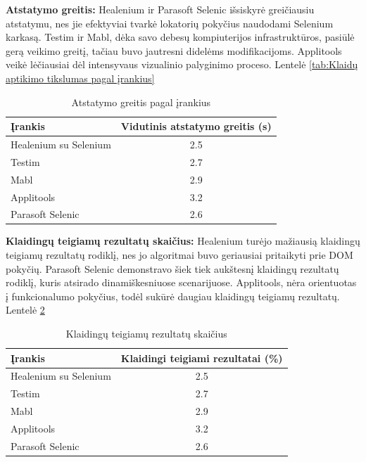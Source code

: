 \documentclass[
]{VUMIFPSkursinis}
\begin{document}
\textbf{Atstatymo greitis:} Healenium ir Parasoft Selenic išsiskyrė greičiausiu atstatymu, nes jie efektyviai tvarkė lokatorių pokyčius naudodami Selenium karkasą. Testim ir Mabl, dėka savo debesų kompiuterijos infrastruktūros, pasiūlė gerą veikimo greitį, tačiau buvo jautresni didelėms modifikacijoms. Applitools veikė lėčiausiai dėl intensyvaus vizualinio palyginimo proceso. Lentelė \ref{tab:Klaidų aptikimo tikslumas pagal įrankius}

\begin{table}[H]\footnotesize
  \centering
  \caption{Atstatymo greitis pagal įrankius}
  {\begin{tabular}{|l|c|} \hline
    Įrankis & Vidutinis atstatymo greitis (s) \\
    \hline
    Healenium su Selenium & 2.5             \\
    Testim                & 2.7            \\
    Mabl                  & 2.9            \\
    Applitools            & 3.2             \\
    Parasoft Selenic      & 2.6             \\
    \hline
  \end{tabular}}
  \label{tab:Atstatymo greitis}
\end{table}

\textbf{Klaidingų teigiamų rezultatų skaičius:} Healenium turėjo mažiausią klaidingų teigiamų rezultatų rodiklį, nes jo algoritmai buvo geriausiai pritaikyti prie DOM pokyčių. Parasoft Selenic demonstravo šiek tiek aukštesnį klaidingų rezultatų rodiklį, kuris atsirado dinamiškesniuose scenarijuose. Applitools, nėra orientuotas į funkcionalumo pokyčius, todėl sukūrė daugiau klaidingų teigiamų rezultatų.
Lentelė \ref{tab:Klaidingų teigiamų rezultatų skaičius}

\begin{table}[H]\footnotesize
  \centering
  \caption{Klaidingų teigiamų rezultatų skaičius}
  {\begin{tabular}{|l|c|} \hline
    Įrankis & Klaidingi teigiami rezultatai (\%) \\
    \hline
    Healenium su Selenium & 2.5             \\
    Testim                & 2.7            \\
    Mabl                  & 2.9            \\
    Applitools            & 3.2             \\
    Parasoft Selenic      & 2.6             \\
    \hline
  \end{tabular}}
  \label{tab:Klaidingų teigiamų rezultatų skaičius}
\end{table}
\end{document}
